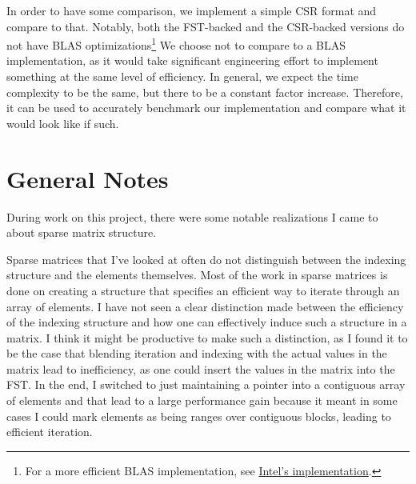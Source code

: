 \documentclass[12pt]{article}
\begin{document}
In order to have some comparison, we implement a simple CSR
format and compare to that. Notably, both the FST-backed and the CSR-backed versions do not have
BLAS optimizations\footnote{For a more efficient BLAS implementation, see
\href{https://software.intel.com/en-us/mkl-developer-reference-c-sparse-blas-csr-matrix-storage-format}
{Intel's implementation}.} We choose not to compare to a BLAS implementation, as it would take
significant engineering effort to implement something at the same level of efficiency. In general,
we expect the time complexity to be the same, but there to be a constant factor increase.
Therefore, it can be used to accurately benchmark our implementation and compare what it would
look like if such.


\appendix
\section{General Notes}
During work on this project, there were some notable realizations I came to about sparse matrix
structure.

Sparse matrices that I've looked at often do not distinguish between the indexing structure and
the elements themselves. Most of the work in sparse matrices is done on creating a structure
that specifies an efficient way to iterate through an array of elements. I have not seen a clear
distinction made between the efficiency of the indexing structure and how one can effectively
induce such a structure in a matrix. I think it might be productive to make such a distinction,
as I found it to be the case that blending iteration and indexing with the actual values in the
matrix lead to inefficiency, as one could insert the values in the matrix into the FST. In the
end, I switched to just maintaining a pointer into a contiguous array of elements and that lead
to a large performance gain because it meant in some cases I could mark elements as being ranges
over contiguous blocks, leading to efficient iteration.
\end{document}

